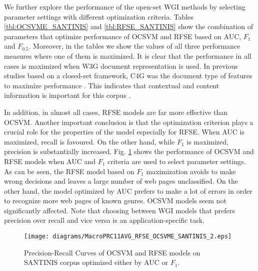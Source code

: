 \documentclass[runningheads]{llncs}
\begin{document}
We further explore the performance of the open-set WGI methods by selecting parameter settings with different optimization criteria. Tables \ref{tbl:OCSVME_SANTINIS} and \ref{tbl:RFSE_SANTINIS} show the combination of parameters that optimize performance of OCSVM and RFSE based on AUC, $F_{1}$ and $F_{0.5}$. Moreover, in the tables we show the values of all three performance measures where one of them is maximized. It is clear that the performance in all cases is maximized when W3G document representation is used. In previous studies based on a closed-set framework, C4G was the document type of features to maximize performance \citep{Sharroff2010}. This indicates that contextual and content information is important for this corpus \citep{Asheghi2015}.

In addition, in almost all cases, RFSE models are far more effective than OCSVM. Another important conclusion is that the optimization criterion plays a crucial role for the properties of the model especially for RFSE. When AUC is maximized, recall is favoured. On the other hand, while $F_{1}$ is maximized, precision is substantially increased. Fig.  \ref{fig:MacroPRC_RFSE_OCSVME_SANTINIS} shows the performance of OCSVM and RFSE models when AUC and $F_{1}$ criteria are used to select parameter settings. As can be seen, the RFSE model based on $F_{1}$ maximization avoids to make wrong decisions and leaves a large number of web pages unclassified. On the other hand, the model optimized by AUC prefers to make a lot of errors in order to recognize more web pages of known genres. OCSVM models seem not significantly affected. Note that choosing between WGI models that prefers precision over recall and vice versa is an application-specific task.

\begin{figure}[H]
\begin{center}
    \texttt{[image: diagrams/MacroPRC11AVG\_RFSE\_OCSVME\_SANTINIS\_2.eps]}
	\caption{Precision-Recall Curves of OCSVM and RFSE models on SANTINIS corpus optimized either by AUC or $F_{1}$.}
	\label{fig:MacroPRC_RFSE_OCSVME_SANTINIS}
	\end{center}
\end{figure}
\end{document}
